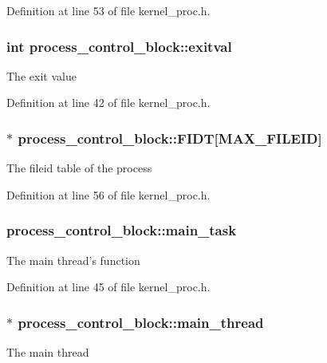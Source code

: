 Definition at line 53 of file kernel\-\_\-proc.\-h.

\hypertarget{structprocess__control__block_add9b4f6d506a3538be7b53411e94fd28}{
\subsubsection[{exitval}]{\setlength{\rightskip}{0pt plus 5cm}int process\-\_\-control\-\_\-block\-::exitval}}\label{structprocess__control__block_add9b4f6d506a3538be7b53411e94fd28}
The exit value 

Definition at line 42 of file kernel\-\_\-proc.\-h.

\hypertarget{structprocess__control__block_aad72d85bd79a3100a497d11630a38977}{
\subsubsection[{F\-I\-D\-T}]{$\ast$ process\-\_\-control\-\_\-block\-::\-F\-I\-D\-T\mbox{[}{\bf M\-A\-X\-\_\-\-F\-I\-L\-E\-I\-D}\mbox{]}}}\label{structprocess__control__block_aad72d85bd79a3100a497d11630a38977}
The fileid table of the process 

Definition at line 56 of file kernel\-\_\-proc.\-h.

\hypertarget{structprocess__control__block_a7d4ddbf8f67ac2bfe9774796b818354e}{
\subsubsection[{main\-\_\-task}]{ process\-\_\-control\-\_\-block\-::main\-\_\-task}}\label{structprocess__control__block_a7d4ddbf8f67ac2bfe9774796b818354e}
The main thread's function 

Definition at line 45 of file kernel\-\_\-proc.\-h.

\hypertarget{structprocess__control__block_a3b7a2a952ec5c19d7331307639c78482}{
\subsubsection[{main\-\_\-thread}]{$\ast$ process\-\_\-control\-\_\-block\-::main\-\_\-thread}}\label{structprocess__control__block_a3b7a2a952ec5c19d7331307639c78482}
The main thread 

